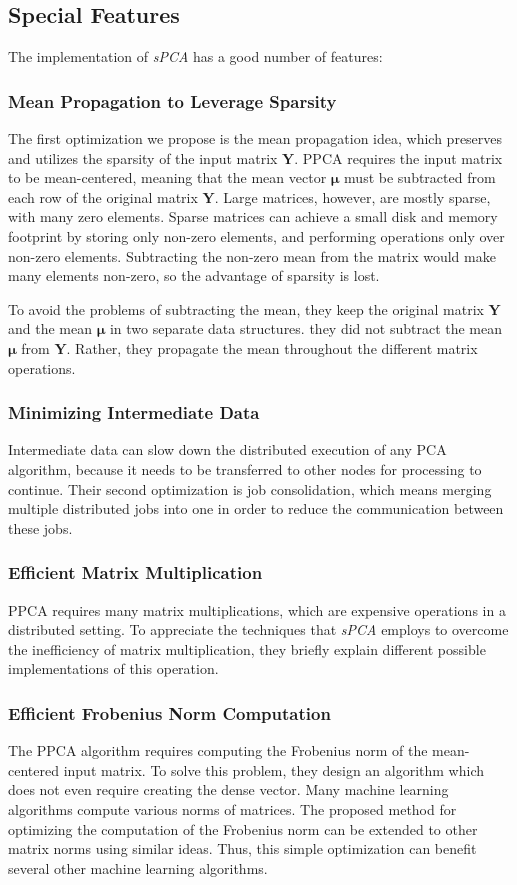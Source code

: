 \subsection{Special Features}
The implementation of \textit{sPCA} has a good number of features:
\subsubsection{Mean Propagation to Leverage Sparsity}
The first optimization we propose is the mean propagation idea, which preserves and utilizes the sparsity of the input matrix $\pmb{Y}$. PPCA requires the input matrix to be mean-centered, meaning that the mean vector $\pmb{\mu}$ must be subtracted from each row of the original matrix $\pmb{Y}$. Large matrices, however, are mostly sparse, with many zero elements. Sparse matrices can achieve a small disk and memory footprint by storing only non-zero elements, and performing operations only over non-zero elements. Subtracting the non-zero mean from the matrix would make many elements non-zero, so the advantage of sparsity is lost.

To avoid the problems of subtracting the mean, they keep the original matrix $\pmb{Y}$ and the mean $\pmb{\mu}$ in two separate data structures. they did not subtract the mean $\pmb{\mu}$ from $\pmb{Y}$. Rather, they propagate the mean throughout the different matrix operations.
\subsubsection{Minimizing Intermediate Data}
Intermediate data can slow down the distributed execution of any PCA algorithm, because it needs to be transferred to other nodes for processing to continue. Their second optimization is job consolidation, which means merging multiple distributed jobs into one in order to reduce the communication between these jobs.
\subsubsection{Efficient Matrix Multiplication}
PPCA requires many matrix multiplications, which are expensive operations in a distributed setting. To appreciate the techniques that \textit{sPCA} employs to overcome the inefficiency of matrix multiplication, they briefly explain different possible implementations of this operation.
\subsubsection{Efficient Frobenius Norm Computation}
The PPCA algorithm requires computing the Frobenius norm of the mean-centered input matrix. To solve this problem, they design an algorithm which does not even require creating the dense vector. Many machine learning algorithms compute various norms of matrices. The proposed method for optimizing the computation of the Frobenius norm can be extended to other matrix norms using similar ideas. Thus, this simple optimization can benefit several other machine learning algorithms.

